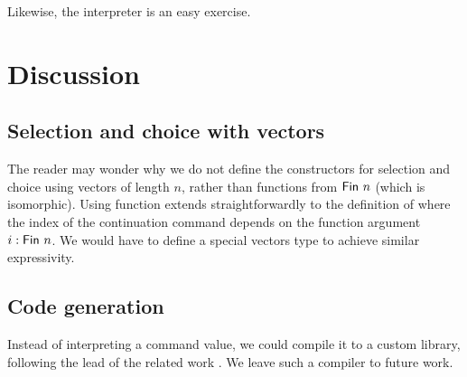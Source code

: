 \documentclass[acmsmall,screen,anonymous,review]{acmart}
\begin{document}
\multiCmd

Likewise, the interpreter {\Aexec} is an easy exercise.

\multiExec

\newpage

\section{Discussion}
\label{sec:discussion}



\subsection{Selection and choice with vectors}
\label{sec:select-choice-with}

The reader may wonder why we do not define the constructors for
selection and choice using vectors of length $n$, rather than
functions from $\AFin~n$ (which is isomorphic). Using function extends
straightforwardly to the definition of {\ACommand} where the {\ASession} index of the
continuation command depends on the function argument $i : \AFin~n$.
We would have to define a special vectors type to achieve similar
expressivity. 

\subsection{Code generation}
\label{sec:code-generation}

Instead of interpreting a command value, we could compile it to a
custom library, following the lead of the related work
\cite{DBLP:journals/pacmpl/00020HNY20,DBLP:conf/cc/Miu0Y021}.
We leave such a compiler to future work.
\end{document}
